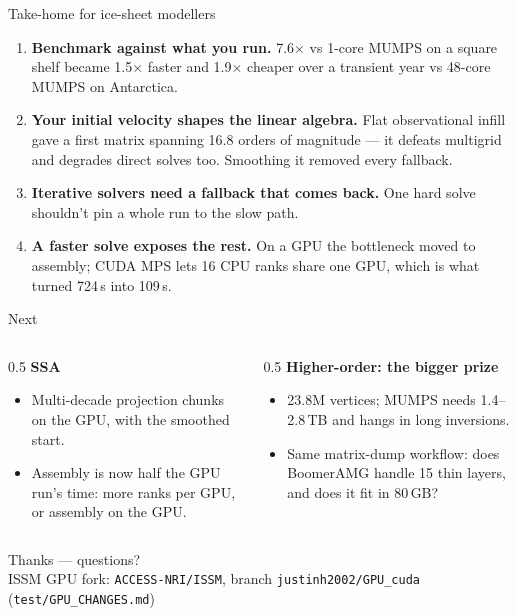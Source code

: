 \documentclass[10pt,aspectratio=169]{beamer}
\begin{document}
\begin{frame}{Take-home for ice-sheet modellers}
  \begin{enumerate}
    \item \textbf{Benchmark against what you run.} 7.6$\times$ vs 1-core MUMPS on a
          square shelf became 1.5$\times$ faster and 1.9$\times$ cheaper over a
          transient year vs 48-core MUMPS on Antarctica.
    \item \textbf{Your initial velocity shapes the linear algebra.} Flat observational
          infill gave a first matrix spanning 16.8 orders of magnitude --- it defeats
          multigrid and degrades direct solves too. Smoothing it removed every
          fallback.
    \item \textbf{Iterative solvers need a fallback that comes back.} One hard solve
          shouldn't pin a whole run to the slow path.
    \item \textbf{A faster solve exposes the rest.} On a GPU the bottleneck moved to
          assembly; CUDA MPS lets 16 CPU ranks share one GPU, which is what turned
          724\,s into 109\,s.
  \end{enumerate}
\end{frame}

\begin{frame}{Next}
  \begin{columns}[T]
    \begin{column}{0.5\textwidth}
      \textbf{SSA}
      \begin{itemize}
        \item Multi-decade projection chunks on the GPU, with the smoothed start.
        \item Assembly is now half the GPU run's time: more ranks per GPU, or
              assembly on the GPU.
      \end{itemize}
    \end{column}
    \begin{column}{0.5\textwidth}
      \textbf{Higher-order: the bigger prize}
      \begin{itemize}
        \item 23.8M vertices; MUMPS needs 1.4--2.8\,TB and hangs in long
              inversions.
        \item Same matrix-dump workflow: does BoomerAMG handle 15 thin layers,
              and does it fit in 80\,GB?
      \end{itemize}
    \end{column}
  \end{columns}
  \vspace{1.2em}
  \begin{center}
    \Large Thanks --- questions?\\[0.4em]
    {\small ISSM GPU fork: \texttt{ACCESS-NRI/ISSM}, branch \texttt{justinh2002/GPU\_cuda}
    (\texttt{test/GPU\_CHANGES.md})}
  \end{center}
\end{frame}
\end{document}
